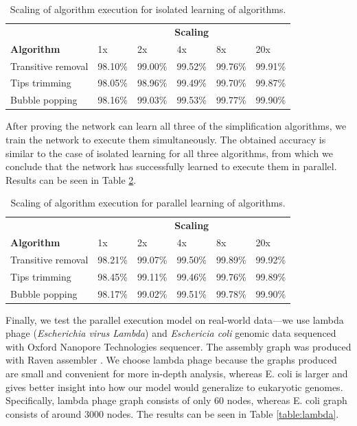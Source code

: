 \documentclass{article}
\begin{document}
\begin{table}
  \caption{Scaling of algorithm execution for isolated learning of algorithms.}
  \label{table:res1}
  \centering
  \begin{tabular}{llllll}
    \toprule
    & \multicolumn{5}{c}{\textbf{Scaling}}                   \\
    \cmidrule(r){2-6}
    \textbf{Algorithm} & 1x & 2x & 4x & 8x & 20x\\
    \midrule
    Transitive removal     & 98.10\% & 99.00\%  & 99.52\% & 99.76\% & 99.91\%   \\
    Tips trimming          & 98.05\% & 98.96\%  & 99.49\% & 99.70\% & 99.87\%   \\
    Bubble popping         & 98.16\% & 99.03\%  & 99.53\% & 99.77\% & 99.90\%   \\
    \bottomrule
  \end{tabular}
\end{table}


After proving the network can learn all three of the simplification algorithms, we train the network to execute them simultaneously. The obtained accuracy is similar to the case of isolated learning for all three algorithms, from which we conclude that the network has successfully learned to execute them in parallel. Results can be seen in Table \ref{table:res2}.

\begin{table}
  \caption{Scaling of algorithm execution for parallel learning of algorithms.}
  \label{table:res2}
  \centering
  \begin{tabular}{llllll}
    \toprule
    & \multicolumn{5}{c}{\textbf{Scaling}}                   \\
    \cmidrule(r){2-6}
    \textbf{Algorithm} & 1x & 2x & 4x & 8x & 20x\\
    \midrule
    Transitive removal     & 98.21\% & 99.07\%  & 99.50\% & 99.89\% & 99.92\%   \\
    Tips trimming          & 98.45\% & 99.11\%  & 99.46\% & 99.76\% & 99.89\%   \\
    Bubble popping         & 98.17\% & 99.02\%  & 99.51\% & 99.78\% & 99.90\%   \\
    \bottomrule
  \end{tabular}
\end{table}

Finally, we test the parallel execution model on real-world data---we use lambda phage (\textit{Escherichia virus Lambda}) and \textit{Eschericia coli} genomic data sequenced with Oxford Nanopore Technologies sequencer. The assembly graph was produced with Raven assembler \cite{vaser2020raven}. We choose lambda phage because the graphs produced are small and convenient for more in-depth analysis, whereas E. coli is larger and gives better insight into how our model would generalize to eukaryotic genomes. Specifically, lambda phage graph consists of only 60 nodes, whereas E. coli graph consists of around 3000 nodes. The results can be seen in Table \ref{table:lambda}.
\end{document}
